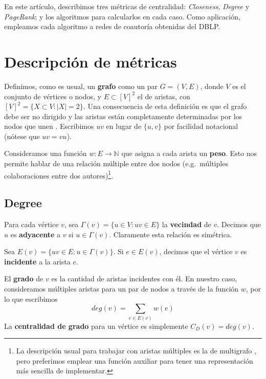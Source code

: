 \documentclass[journal]{IEEEtran}
\begin{document}
En este artículo, describimos tres métricas de centralidad: \textit{Closeness}, \textit{Degree} y \textit{PageRank}; y los algoritmos para calcularlos en cada caso. Como aplicación, empleamos cada algoritmo a redes de coautoría obtenidas del DBLP.

\section{Descripción de métricas} \label{sec:metricas}

Definimos, como es usual, un \textbf{grafo} como un par \(G = (V, E)\), donde \(V\) es el conjunto de vértices o nodos, y \(E \subset [V]^2 \) el de aristas, con \([V]^2 = \{ X \subset V : |X| = 2 \}\). Una consecuencia de esta definición es que el grafo debe ser no dirigido y las aristas están completamente determinadas por los nodos que unen \cite{diestel}. Escribimos \(uv\) en lugar de \(\{u, v\}\) por facilidad notacional (nótese que \(uv = vu\)).

Consideramos una función \(w: E \rightarrow \mathbb{N} \) que asigna a cada arista un \textbf{peso}. Esto nos permite hablar de una relación múltiple entre dos nodos (e.g.\ múltiples colaboraciones entre dos autores)\footnote{La descripción usual para trabajar con aristas múltiples es la de multigrafo \cite{diestel}, pero preferimos emplear una función auxiliar para tener una representación más sencilla de implementar. }.
\subsection{Degree}
Para cada vértice \(v\), sea \(\Gamma(v) = \{u \in V : uv \in E \}\) la \textbf{vecindad} de \(v\). Decimos que \(u\) es \textbf{adyacente} a \(v\) si \(u \in \Gamma(v)\). Claramente esta relación es simétrica.

Sea \(E(v) = \{uv \in E : u \in \Gamma(v) \}\). Si \(e \in E(v)\), decimos que el vértice \(v\) es \textbf{incidente} a la arista \(e\).

El \textbf{grado} de \(v\) es la cantidad de aristas incidentes con él. En nuestro caso, consideramos múltiples aristas para un par de nodos a través de la función \(w\), por lo que escribimos \cite{bollobas}
\begin{equation}
	deg(v) = \sum_{e \in E(v)} w(e)
\end{equation}
La \textbf{centralidad de grado} para un vértice es simplemente \(C_D (v) = deg(v)\).
\end{document}
